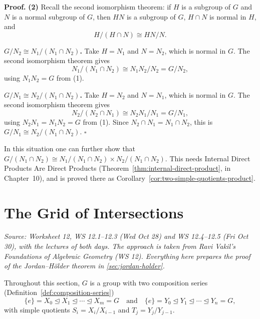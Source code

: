 \documentclass[11pt]{report}
\renewenvironment{proof}[1][Proof]{\noindent\textbf{#1.} }{\hfill$\square$\par\vspace{5pt}}
\begin{document}
\begin{proof}
\textbf{(2)} Recall the second isomorphism theorem: if $H$ is a subgroup of $G$ and $N$ is a normal subgroup of $G$, then $HN$ is a subgroup of $G$, $H \cap N$ is normal in $H$, and
\[
H/(H \cap N) \cong HN/N.
\]

\textbf{$G/N_2 \cong N_1/(N_1 \cap N_2)$.} Take $H = N_1$ and $N = N_2$, which is normal in $G$. The second isomorphism theorem gives
\[
N_1/(N_1 \cap N_2) \cong N_1N_2/N_2 = G/N_2,
\]
using $N_1N_2 = G$ from (1).

\textbf{$G/N_1 \cong N_2/(N_1 \cap N_2)$.} Take $H = N_2$ and $N = N_1$, which is normal in $G$. The second isomorphism theorem gives
\[
N_2/(N_2 \cap N_1) \cong N_2N_1/N_1 = G/N_1,
\]
using $N_2N_1 = N_1N_2 = G$ from (1). Since $N_2 \cap N_1 = N_1 \cap N_2$, this is $G/N_1 \cong N_2/(N_1 \cap N_2)$.
\end{proof}

\begin{rembox}\label{rem:two-simple-quotients-product}
In this situation one can further show that $G/(N_1 \cap N_2) \cong N_1/(N_1 \cap N_2) \times N_2/(N_1 \cap N_2)$. This needs Internal Direct Products Are Direct Products (Theorem~\ref{thm:internal-direct-product}, in Chapter~10), and is proved there as Corollary~\ref{cor:two-simple-quotients-product}.
\end{rembox}

\section{The Grid of Intersections}\label{sec:jh-grid}

\textit{Source: Worksheet 12, WS 12.1--12.3 (Wed Oct 28) and WS 12.4--12.5 (Fri Oct 30), with the lectures of both days. The approach is taken from Ravi Vakil's \emph{Foundations of Algebraic Geometry} (WS 12). Everything here prepares the proof of the Jordan--H\"older theorem in \ref{sec:jordan-holder}.}

Throughout this section, $G$ is a group with two composition series (Definition~\ref{def:composition-series})
\[ \{e\} = X_0 \trianglelefteq X_1 \trianglelefteq \cdots \trianglelefteq X_m = G \quad\text{and}\quad \{e\} = Y_0 \trianglelefteq Y_1 \trianglelefteq \cdots \trianglelefteq Y_n = G, \]
with simple quotients $S_i = X_i/X_{i-1}$ and $T_j = Y_j/Y_{j-1}$.
\end{document}
